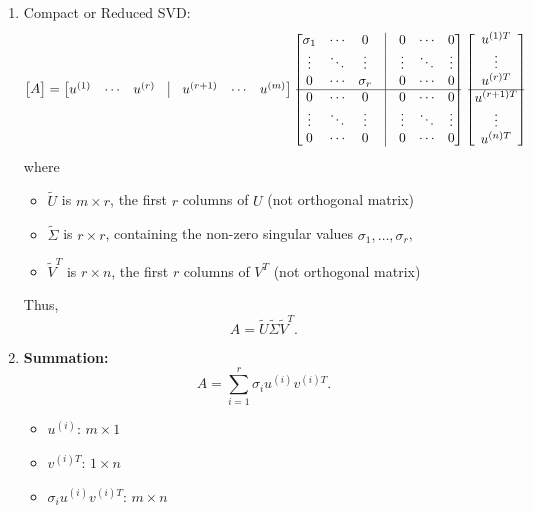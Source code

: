 \begin{definition}
\begin{enumerate}
        \item Compact or Reduced SVD:
        \[
        \begin{bmatrix} A \end{bmatrix} = 
        \begin{bmatrix} 
        u^{(1)} & \cdots & u^{(r)} & \vline & u^{(r+1)} & \cdots & u^{(m)} 
        \end{bmatrix}
        \begin{bmatrix}
            \sigma_1 & \cdots & 0 & \vline & 0 & \cdots & 0 \\
            \vdots & \ddots & \vdots & \vline & \vdots & \ddots & \vdots \\
            0 & \cdots & \sigma_r & \vline & 0 & \cdots & 0 \\
            \hline
            0 & \cdots & 0 & \vline & 0 & \cdots & 0 \\
            \vdots & \ddots & \vdots & \vline & \vdots & \ddots & \vdots \\
            0 & \cdots & 0 & \vline & 0 & \cdots & 0 
        \end{bmatrix}
        \begin{bmatrix}
            u^{(1) T} \\
            \vdots \\
            u^{(r) T} \\
            \hline
            u^{(r+1) T} \\
            \vdots \\
            u^{(n) T}
        \end{bmatrix}
        \]
        where
        \begin{itemize}
            \item \( \tilde{U} \) is \( m \times r \), the first \( r \) columns of \( U \) (not orthogonal matrix)
            \item \( \tilde{\Sigma} \) is \( r \times r \), containing the non-zero singular values \( \sigma_1, \dots, \sigma_r \),
            \item \( \tilde{V}^T \) is \( r \times n \), the first \( r \) columns of \( V^T \) (not orthogonal matrix)
        \end{itemize}
    
        Thus,
        \[
        A = \tilde{U} \tilde{\Sigma} \tilde{V}^T.
        \]
        \item \textbf{Summation:}
        \begin{equation*}
            A = \sum_{i=1}^r \sigma_i u^{(i)} v^{(i) T}.
        \end{equation*}
        \begin{itemize}
            \item $u^{(i)}$: $m \times 1$
            \item $v^{(i)T}$: $1 \times n$
            \item $\sigma_i u^{(i)} v^{(i) T}$: $m \times n$
        \end{itemize}
    \end{enumerate}
\end{definition}


